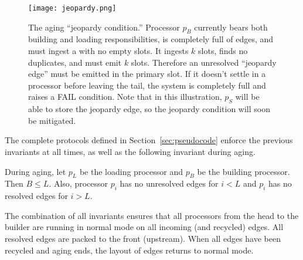 \begin{figure*}[thb]
\begin{center}
\texttt{[image: jeopardy.png]} \\
\end{center}
\caption{\label{fig:jeopardy} The \XSCC aging ``jeopardy
condition.'' Processor $p_B$ currently bears both building and loading
responsibilities, is completely full of edges, and must ingest a \bundle
with no empty slots. It ingests $k$ slots, finds no duplicates,
and must emit $k$ slots. Therefore an unresolved ``jeopardy edge''
must be emitted in the primary slot.  If it doesn't settle in a 
processor before leaving the tail, the system is completely full and raises a
FAIL condition. Note that in this illustration, $p_S$ will be able to store
the jeopardy edge, so the jeopardy condition will soon be mitigated.}
\end{figure*}

The complete \XSCC protocols defined in Section~\ref{sec:pseudocode} 
enforce the previous invariants at all times, as well as the following
invariant during aging.  
\begin{invariant}
During aging, let $p_L$ be the loading processor and $p_B$ be the building processor. 
Then $B \le L$.  Also, processor $p_i$ has no unresolved edges for $i < L$
and $p_i$ has no resolved edges for $i > L$. \label{inv:aging-1}
\end{invariant}

The combination of all invariants ensures that all processors from the head to the builder are running \XSCC in normal mode on all incoming (and recycled) edges. All resolved edges are packed to the front (upstream).  When all edges have been recycled and aging ends, the layout of edges returns to normal mode.


